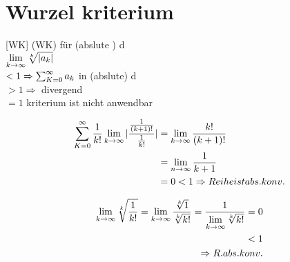 \section{Wurzel kriterium}[WK]
(WK) für (abslute ) d
\\ $\lim\limits_{k \rightarrow \infty} \sqrt[k]{|a_k|}$\\
$<1 \Rightarrow \sum_{K=0}^{\infty} a_k$ in (abslute) d\\
$>1 \Rightarrow$ divergend\\
$=1 $ kriterium ist nicht anwendbar
\begin{example}[QK]
	 \begin{equation*}
		 \begin{split}
	    	\sum_{K=0}^{\infty} \frac{1}{k!}
	 	   \lim\limits_{k \rightarrow \infty} |\frac{\frac{1}{(k+1)!}}{\frac{1}{k!}}| &= \lim\limits_{k \rightarrow \infty} \frac{k!}{(k+1)!} \\
													   	   &=\lim\limits_{n \rightarrow \infty} \frac{1}{k+1}   \\
													   	   &=0<1 \Rightarrow Reihe ist abs. konv.
		    \end{split}	 
		 \end{equation*}     
	
\end{example}
\begin{example}[WK]
	\begin{equation*}
	\begin{split}
	\lim\limits_{k \rightarrow \infty} \sqrt[k]{\frac{1}{k!}}= \lim\limits_{k \rightarrow \infty} \frac{\sqrt[k]{1}}{\sqrt[k]{k!}}=\frac{1}{\lim\limits_{k \rightarrow \infty} \sqrt[k]{k!}}=0\\ <1 \\
	\Rightarrow R.abs.konv.
	\end{split}	 
	\end{equation*}     
	
\end{example}